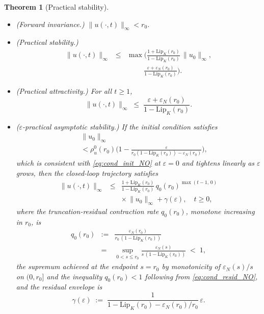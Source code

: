 \documentclass[twocolumn,amsthm]{autart}
\newcommand{\Lipk}{\mathrm{Lip}_K}
\newcommand{\eps}{\varepsilon}
\theoremstyle{plain}
\newtheorem{theorem}{Theorem}
\theoremstyle{definition}
\begin{document}
\begin{theorem}[Practical stability]
\begin{itemize}
\item[(i)] \emph{(Forward invariance.)} $\|u(\cdot,t)\|_\infty < r_0$.
\item[(ii)] \emph{(Practical stability.)}
\begin{eqnarray}
\|u(\cdot,t)\|_\infty &\le& \max\biggl(\frac{1+\Lipk(r_0)}{1-\Lipk(r_0)}\,\|u_0\|_\infty, \nonumber \\
&& \qquad\ \, \frac{\eps + \eps_N(r_0)}{1-\Lipk(r_0)}\biggr).
\label{eq:stab-ii}
\end{eqnarray}
\item[(iii)] \emph{(Practical attractivity.)} For all $t \ge 1$,
\begin{equation}
\|u(\cdot,t)\|_\infty \;\le\; \frac{\eps + \eps_N(r_0)}{1-\Lipk(r_0)}.
\label{eq:stab-iii}
\end{equation}
\item[(iv)] \emph{($\eps$-practical asymptotic stability.)} If the initial condition satisfies
\begin{eqnarray}
&& \|u_0\|_\infty \nonumber \\
&& < \rho_u^0(r_0)\biggl(1 - \frac{\eps}{r_0(1-\Lipk(r_0)) - \eps_N(r_0)}\biggr),
\label{eq:cond_init_NO_sharp}
\end{eqnarray}
which is consistent with \eqref{eq:cond_init_NO} at $\eps = 0$ and tightens linearly as $\eps$ grows, then the closed-loop trajectory satisfies
\begin{eqnarray}
\|u(\cdot,t)\|_\infty &\le& \frac{1 + \Lipk(r_0)}{1-\Lipk(r_0)}\,q_0(r_0)^{\max(t-1,\, 0)} \nonumber \\
&& \times\, \|u_0\|_\infty + \gamma(\eps), \quad t \ge 0,
\label{eq:stab-iv}
\end{eqnarray}
where the truncation-residual contraction rate $q_0(r_0)$, monotone increasing in $r_0$, is
\begin{eqnarray}
q_0(r_0) &:=& \frac{\eps_N(r_0)}{r_0\,(1 - \Lipk(r_0))} \nonumber \\
&=& \sup_{0 < s \le r_0}\frac{\eps_N(s)}{s\,(1 - \Lipk(r_0))} \;<\; 1,
\label{eq:q0-def}
\end{eqnarray}
the supremum achieved at the endpoint $s = r_0$ by monotonicity of $\eps_N(s)/s$ on $(0, r_0]$ and the inequality $q_0(r_0) < 1$ following from \eqref{eq:cond_resid_NO}, and the residual envelope is
\begin{equation}
\gamma(\eps) \;:=\; \frac{1}{1 - \Lipk(r_0) - \eps_N(r_0)/r_0}\,\eps.
\label{eq:gamma-def}
\end{equation}
\end{itemize}
\end{theorem}
\end{document}
